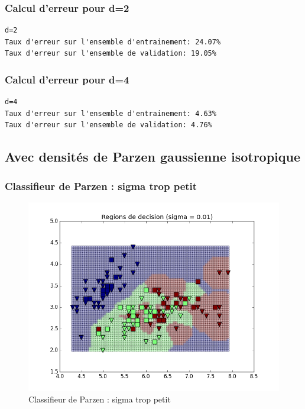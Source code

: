 \documentclass[a4paper,10pt]{article}
\begin{document}
\subsubsection{Calcul d'erreur pour d=2}
\begin{verbatim}
d=2
Taux d'erreur sur l'ensemble d'entrainement: 24.07%
Taux d'erreur sur l'ensemble de validation: 19.05%	
\end{verbatim}

\subsubsection{Calcul d'erreur pour d=4}

\begin{verbatim}
d=4
Taux d'erreur sur l'ensemble d'entrainement: 4.63%
Taux d'erreur sur l'ensemble de validation: 4.76%
\end{verbatim}

\subsection{Avec densités de Parzen gaussienne isotropique}

\subsubsection{Classifieur de Parzen : sigma trop petit}
\begin{figure}[H]
	\includegraphics[width=12cm]{images/bayes_parzen_petit.png} 
	\centering
	\caption{Classifieur de Parzen : sigma trop petit}
	\label{fig:comp}
\end{figure}
\end{document}
